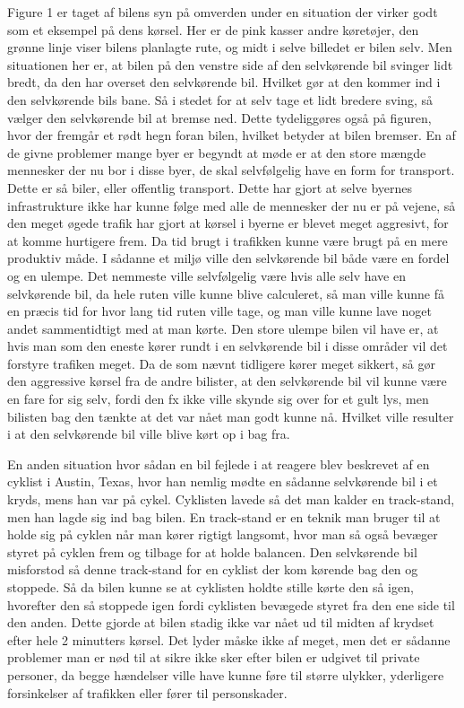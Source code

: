 Figure 1 er taget af bilens syn på omverden under  en situation der virker godt som  et eksempel på dens kørsel. Her er de pink kasser andre køretøjer, den grønne linje viser bilens planlagte rute, og midt i selve billedet er bilen selv. Men situationen her er, at bilen på den venstre side af den selvkørende bil svinger lidt bredt, da den har overset den selvkørende bil. Hvilket gør at den kommer ind i den selvkørende bils bane. Så i stedet for at selv tage et lidt bredere sving, så vælger den selvkørende bil at bremse ned. Dette tydeliggøres også på figuren, hvor der fremgår et rødt hegn foran bilen, hvilket  betyder at bilen bremser\cite{Backchannel}. En af de givne problemer mange byer er begyndt at møde er at den store mængde mennesker der nu bor i disse byer, de skal selvfølgelig have en form for transport. Dette er så biler, eller offentlig transport. Dette har gjort at selve byernes infrastrukture ikke har kunne følge med alle de mennesker der nu er på vejene, så den meget øgede trafik har gjort at  kørsel i byerne er blevet meget aggresivt, for at komme hurtigere frem. Da tid brugt i trafikken kunne være brugt på en mere produktiv måde\cite{Michelin}. I sådanne et miljø ville den selvkørende bil både være en fordel og en ulempe. Det nemmeste ville selvfølgelig være hvis alle selv have en selvkørende bil, da hele ruten ville kunne blive calculeret, så man ville kunne få en præcis tid for hvor lang tid ruten ville tage, og man ville kunne lave noget andet sammentidtigt med at man kørte. Den store ulempe bilen vil have er, at hvis man som den eneste kører rundt i en selvkørende bil i disse områder vil det forstyre trafiken meget. Da de som nævnt tidligere kører meget sikkert, så gør den aggressive kørsel fra de andre bilister, at den selvkørende bil vil kunne være en fare for sig selv, fordi den fx ikke ville skynde sig over for et gult lys, men bilisten bag den tænkte at det var nået man godt kunne nå. Hvilket ville resulter i at den selvkørende bil ville blive kørt op i bag fra.

En anden situation hvor sådan en bil fejlede i at reagere blev beskrevet af en cyklist i Austin, Texas, hvor han nemlig mødte en sådanne selvkørende bil i et kryds, mens han var på cykel. Cyklisten lavede så det man kalder en track-stand, men han lagde sig ind bag bilen. En track-stand er en teknik man bruger til at holde sig på cyklen når man kører rigtigt langsomt, hvor man så også bevæger styret på cyklen frem og tilbage for at holde balancen. Den selvkørende bil misforstod så denne track-stand for en cyklist der kom kørende bag den og stoppede. Så da bilen kunne se at cyklisten holdte stille kørte den så igen, hvorefter den så stoppede igen fordi cyklisten bevægede styret fra den ene side til den anden. Dette gjorde at bilen stadig ikke var nået ud til midten af krydset efter hele 2 minutters kørsel\cite{VOX}. Det lyder måske ikke af meget, men det er sådanne problemer man er nød til at sikre ikke sker efter bilen er udgivet til private personer, da begge hændelser ville have kunne føre til større ulykker, yderligere forsinkelser af trafikken eller fører til personskader. 